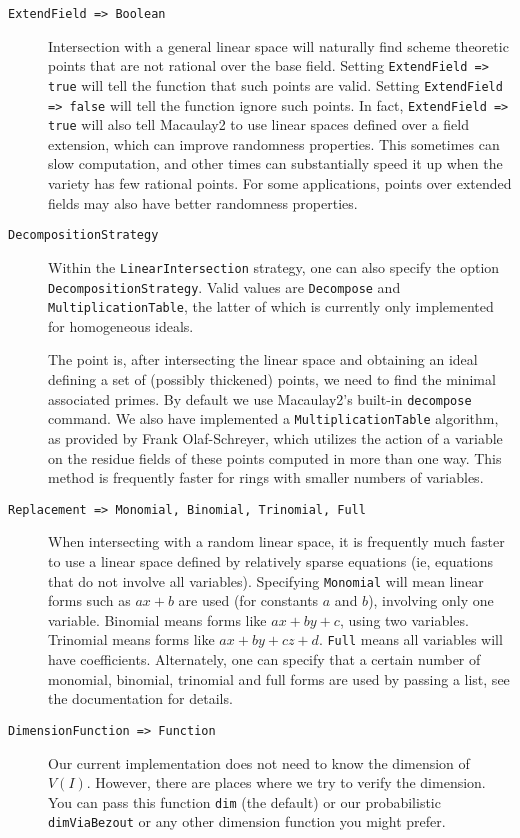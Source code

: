\documentclass[11pt]{amsart}
\theoremstyle{definition}
\begin{document}
\begin{description}
    \item[\tt ExtendField => Boolean] 

    Intersection with a general linear space will naturally find scheme theoretic points that are not rational over the base field.  
    Setting {\tt ExtendField => true} will tell the function that such points are valid.  Setting {\tt ExtendField => false} will tell the function ignore such points.  
    In fact, {\tt ExtendField => true} will also tell Macaulay2 to use linear spaces defined over a field extension, which can improve randomness properties.
    This sometimes can slow computation, and other times can substantially speed it up when the variety has few rational points.  For some applications, points over extended fields may also have better randomness properties.

    \item[\tt DecompositionStrategy]  Within the {\tt LinearIntersection} strategy, one can also specify the option {\tt DecompositionStrategy}.  Valid values are {\tt Decompose} and {\tt MultiplicationTable}, the latter of which is currently only implemented for homogeneous ideals.  
    
    The point is, after intersecting the linear space and obtaining an ideal defining a set of (possibly thickened) points, we need to find the minimal associated primes.  By default we use Macaulay2's built-in {\tt decompose} command.  We also have implemented a {\tt MultiplicationTable} algorithm, as provided by Frank Olaf-Schreyer, which utilizes the action of a variable on the residue fields of these points computed in more than one way.  This method is frequently faster for rings with smaller numbers of variables.


    \item[\tt Replacement => Monomial, Binomial, Trinomial, Full]
        When intersecting with a random linear space, it is frequently much faster to use a linear space defined by relatively sparse equations (ie, equations that do not involve all variables).   Specifying {\tt Monomial} will mean linear forms such as $ax + b$ are used (for constants $a$ and $b$), involving only one variable.  Binomial means forms like $ax + by + c$, using two variables.  Trinomial means forms like $ax + by + cz + d$.  {\tt Full} means all variables will have coefficients.  Alternately, one can specify that a certain number of monomial, binomial, trinomial and full forms are used by passing a list, see the documentation for details.

    \item[\tt DimensionFunction => Function]
        Our current implementation does not need to know the dimension of $V(I)$.  However, there are places where we try to verify the dimension.  You can pass this function {\tt dim} (the default) or our probabilistic {\tt dimViaBezout} or any other dimension function you might prefer.


\end{description}
\end{document}
